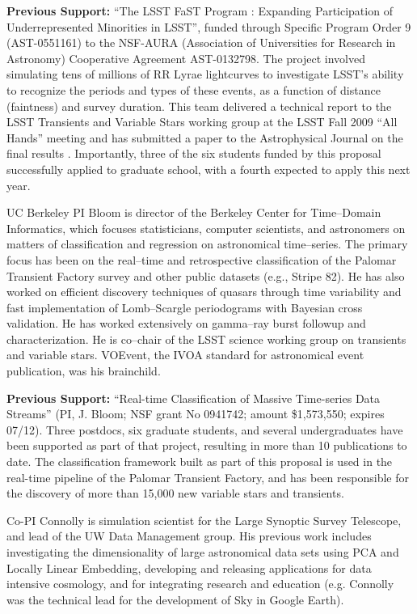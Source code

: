 {\bf Previous Support:} ``The LSST FaST Program : Expanding Participation of
Underrepresented Minorities in LSST'', funded through Specific Program Order 9
(AST-0551161) to the NSF-AURA (Association of Universities for Research in
Astronomy) Cooperative Agreement AST-0132798.  The project involved simulating
tens of millions of RR Lyrae lightcurves to investigate LSST's ability to
recognize the periods and types of these events, as a function of distance
(faintness) and survey duration.  This team delivered a technical report to the
LSST Transients and Variable Stars working group at the LSST Fall 2009 ``All
Hands'' meeting and has submitted a paper to the Astrophysical Journal on the
final results \citep{RRLyrae}. Importantly, three of the six students funded by
this proposal successfully applied to graduate school, with a fourth expected to
apply this next year.

 \smallskip

UC Berkeley PI Bloom is director of the Berkeley Center for Time--Domain Informatics,
which focuses statisticians, computer scientists, and astronomers on matters of
classification and regression on astronomical time--series.  The primary focus
has been on the real--time and retrospective classification of the Palomar
Transient Factory survey and other public datasets (e.g., Stripe 82). He has
also worked on efficient discovery techniques of quasars through time
variability and fast implementation of Lomb--Scargle periodograms with Bayesian
cross validation. He has worked extensively on gamma--ray burst followup and
characterization. He is co--chair of the LSST science working group on
transients and variable stars. VOEvent, the IVOA standard for astronomical event
publication, was his brainchild.

{\bf Previous Support:} ``Real-time Classification of Massive Time-series Data
Streams'' (PI, J. Bloom; NSF grant No 0941742; amount \$1,573,550; expires
07/12).  Three postdocs, six graduate students, and several undergraduates have
been supported as part of that project, resulting in more than 10 publications
to date.  The classification framework built as part of this proposal is used in
the real-time pipeline of the Palomar Transient Factory, and has been
responsible for the discovery of more than 15,000 new variable stars and
transients.

 \smallskip

Co-PI Connolly is simulation scientist for the Large Synoptic Survey Telescope,
and lead of the UW Data Management group.  His previous work includes
investigating the dimensionality of large astronomical data sets using PCA and
Locally Linear Embedding, developing and releasing applications for data
intensive cosmology, and for integrating research and education (e.g. Connolly
was the technical lead for the development of Sky in Google Earth).


